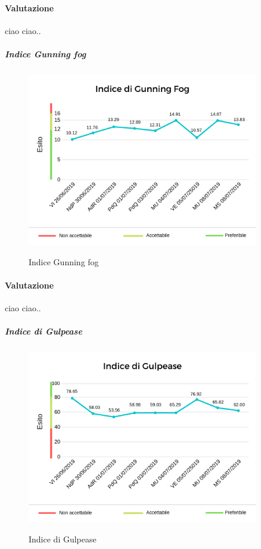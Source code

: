 	\paragraph*{Valutazione} ciao ciao..
	\pagebreak
	\subparagraph{Indice Gunning fog}
	\begin{center}
		\begin{figure}[h] 
			\centering 
			\includegraphics[width=0.90\textwidth]{res/images/new/gunningfog.png}\\
			\caption{Indice Gunning fog}
		\end{figure}
	\end{center}
	\paragraph*{Valutazione} ciao ciao..
	\pagebreak
	\subparagraph{Indice di Gulpease}
	\begin{center}
		\begin{figure}[h] 
			\centering 
			\includegraphics[width=0.90\textwidth]{res/images/new/gulpease.png}\\
			\caption{Indice di Gulpease}
		\end{figure}
	\end{center}
